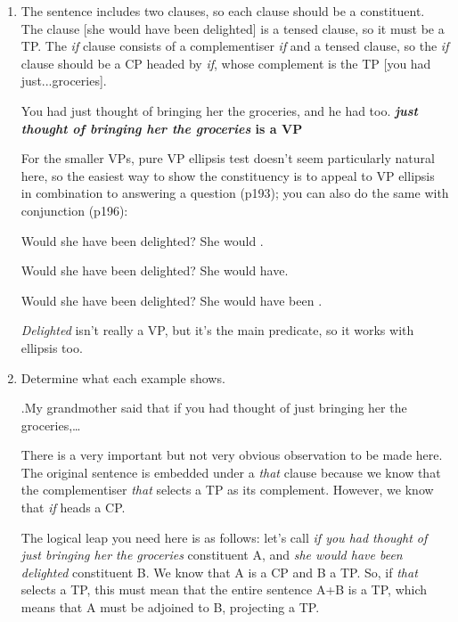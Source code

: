 \documentclass[a4paper,12pt]{article}
\begin{document}
\begin{enumerate}
\begin{enumerate}[label=(\roman*)]
         \item The sentence includes two clauses, so each clause should be a constituent. The clause [she would have been delighted] is a tensed clause, so it must be a TP. The \textit{if} clause consists of a complementiser \textit{if} and a tensed clause, so the \textit{if} clause should be a CP headed by \textit{if}, whose complement is the TP [you had just...groceries].

             You had just thought of bringing her the groceries, and he had  too. \textbf{\textit{just thought of bringing her the groceries} is a VP}

             For the smaller VPs, pure VP ellipsis test doesn't seem particularly natural here, so the easiest way to show the constituency is to appeal to VP ellipsis in combination to answering a question (p193); you can also do the same with conjunction (p196):
                         
             Would she have been delighted? She would .
             
             Would she have been delighted? She would have.
             
             Would she have been delighted? She would have been .
             
             \textit{Delighted} isn't really a VP, but it's the main predicate, so it works with ellipsis too.

         \item Determine what each example shows.

         \ex.My grandmother said that if you had thought of just bringing her the groceries,\ldots

         There is a very important but not very obvious observation to be made here. The original sentence is embedded under a \textit{that} clause because we know that the complementiser \textit{that} selects a TP as its complement. However, we know that \textit{if} heads a CP.
         
         The logical leap you need here is as follows: let's call \textit{if you had thought of just bringing her the groceries} constituent A, and \textit{she would have been delighted} constituent B. We know that A is a CP and B a TP. So, if \textit{that} selects a TP, this must mean that the entire sentence A+B is a TP, which means that A must be adjoined to B, projecting a TP.


\end{enumerate}
\end{enumerate}
\end{document}
